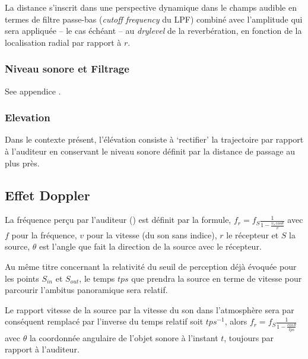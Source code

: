 La distance s'inscrit dans une perspective dynamique dans le champs audible en termes de filtre passe-bas (\textit{cutoff frequency} du LPF) combin\'e avec l'amplitude qui sera appliqu\'ee -- le cas \'ech\'eant -- au \textit{drylevel} de la reverb\'eration, en fonction de la localisation radial par rapport \`a $r$.%

\subsubsection*{Niveau sonore et Filtrage}

See appendice .

\subsubsection*{Elevation}

Dans le contexte pr\'esent, l'\'el\'evation consiste \`a `rectifier' la trajectoire par rapport \`a l'auditeur en conservant le niveau sonore d\'efinit par la distance de passage au plus pr\`es.%

\normalfont

\subsection*{Effet Doppler}

La fr\'equence per\c{c}u par l'auditeur () est d\'efinit par la formule,
$f_r= \displaystyle f_S  \frac{1}{\displaystyle 1- \frac{v_s \, cos \theta}{v}}$
avec $f$ pour la fr\'equence, $v$ pour la vitesse (du son sans indice), $r$ le r\'ecepteur et $S$ la source, $\theta$ est l'angle que fait la direction de la source avec le r\'ecepteur.

Au m\^eme titre concernant la relativit\'e du seuil de perception d\'ej\`a \'evoqu\'ee pour les points $S_{in}$ et $S_{out}$, le temps $tps$ que prendra la source en terme de vitesse pour parcourir l'ambitus panoramique sera relatif. 

Le rapport vitesse de la source par la vitesse du son dans l'atmosph\`ere sera par cons\'equent remplac\'e par l'inverse du temps relatif soit $tps^{-1}$, alors $f_r=f_S \displaystyle \frac{1}{1- \displaystyle \frac{cos \, \theta}{tps}}$ avec $\theta$ la coordonn\'ee angulaire de l'objet sonore \`a l'instant $t$, toujours par rapport \`a l'auditeur.

\newpage

